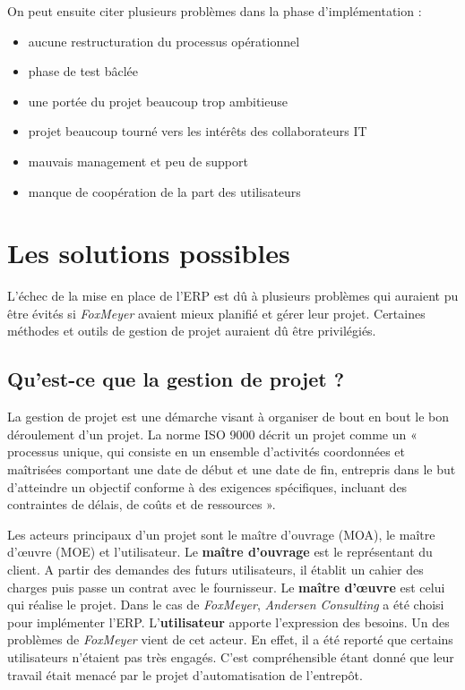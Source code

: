\documentclass[12pt]{report}
\begin{document}
On peut ensuite citer plusieurs problèmes dans la phase d’implémentation :
\begin{itemize}
\item aucune restructuration du processus opérationnel
\item phase de test bâclée
\item une portée du projet beaucoup trop ambitieuse
\item projet beaucoup tourné vers les intérêts des collaborateurs IT
\item mauvais management et peu de support
\item manque de coopération de la part des utilisateurs
\end{itemize}


\section{Les solutions possibles}

L'échec de la mise en place de l'ERP est dû à plusieurs problèmes qui auraient pu être évités si \textit{FoxMeyer} avaient mieux planifié et gérer leur projet. Certaines méthodes et outils de gestion de projet auraient dû être privilégiés.

\subsection{Qu'est-ce que la gestion de projet ?}

La gestion de projet est une démarche visant à organiser de bout en bout le bon déroulement d'un projet.
La norme ISO 9000 décrit un projet comme un « processus unique, qui consiste en un ensemble d'activités coordonnées et maîtrisées comportant une date de début et une date de fin, entrepris dans le but d'atteindre un objectif conforme à des 
exigences spécifiques, incluant des contraintes de délais, de coûts et de ressources ».

Les acteurs principaux d'un projet sont le maître d'ouvrage (MOA), le maître d’œuvre (MOE) et l'utilisateur.
Le \textbf{maître d'ouvrage} est le représentant du client. A partir des demandes des futurs utilisateurs, il établit un cahier des charges puis passe un contrat avec le fournisseur.
Le \textbf{maître d’œuvre} est celui qui réalise le projet. Dans le cas de \textit{FoxMeyer}, \textit{Andersen Consulting} a été choisi pour implémenter l'ERP.
L'\textbf{utilisateur} apporte l'expression des besoins. Un des problèmes de \textit{FoxMeyer} vient de cet acteur. En effet, il a été reporté que certains utilisateurs n'étaient pas très engagés. C'est compréhensible étant donné que leur travail était menacé par le projet d'automatisation de l'entrepôt.
\end{document}
